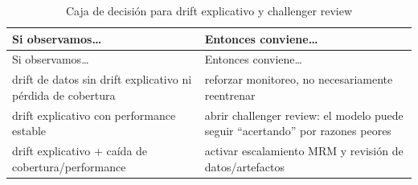 \documentclass[
  spanish,
  11pt,
  letterpaper,
]{scrbook}
\theoremstyle{plain}
\theoremstyle{remark}
\begin{document}
\begin{longtable}[]{@{}
  >{\raggedright\arraybackslash}p{}
  >{\raggedright\arraybackslash}p{}@{}}
\caption{Caja de decisión para drift explicativo y challenger
review}\label{tbl-explanation-drift-decision}\tabularnewline
\toprule\noalign{}
\begin{minipage}[b]{\linewidth}\raggedright
Si observamos\ldots{}
\end{minipage} & \begin{minipage}[b]{\linewidth}\raggedright
Entonces conviene\ldots{}
\end{minipage} \\
\midrule\noalign{}
\endfirsthead
\toprule\noalign{}
\begin{minipage}[b]{\linewidth}\raggedright
Si observamos\ldots{}
\end{minipage} & \begin{minipage}[b]{\linewidth}\raggedright
Entonces conviene\ldots{}
\end{minipage} \\
\midrule\noalign{}
\endhead
\bottomrule\noalign{}
\endlastfoot
drift de datos sin drift explicativo ni pérdida de cobertura & reforzar
monitoreo, no necesariamente reentrenar \\
drift explicativo con performance estable & abrir challenger review: el
modelo puede seguir ``acertando'' por razones peores \\
drift explicativo + caída de cobertura/performance & activar
escalamiento MRM y revisión de datos/artefactos \\
\end{longtable}
\end{document}

